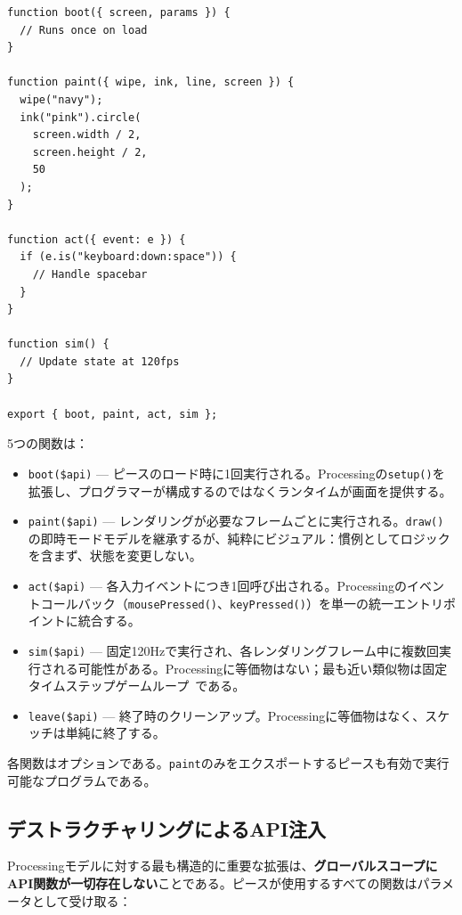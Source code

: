 \documentclass[10pt,letterpaper,twocolumn]{article}
\begin{document}
\begin{lstlisting}[style=acjsstyle,caption={最小限のACピース。}]
function boot({ screen, params }) {
  // Runs once on load
}

function paint({ wipe, ink, line, screen }) {
  wipe("navy");
  ink("pink").circle(
    screen.width / 2,
    screen.height / 2,
    50
  );
}

function act({ event: e }) {
  if (e.is("keyboard:down:space")) {
    // Handle spacebar
  }
}

function sim() {
  // Update state at 120fps
}

export { boot, paint, act, sim };
\end{lstlisting}

5つの関数は：

\begin{itemize}
  \item \texttt{boot(\$api)} --- ピースのロード時に1回実行される。Processingの\texttt{setup()}を拡張し、プログラマーが構成するのではなくランタイムが画面を提供する。
  \item \texttt{paint(\$api)} --- レンダリングが必要なフレームごとに実行される。\texttt{draw()}の即時モードモデルを継承するが、純粋にビジュアル：慣例としてロジックを含まず、状態を変更しない。
  \item \texttt{act(\$api)} --- 各入力イベントにつき1回呼び出される。Processingのイベントコールバック（\texttt{mousePressed()}、\texttt{keyPressed()}）を単一の統一エントリポイントに統合する。
  \item \texttt{sim(\$api)} --- 固定120Hzで実行され、各レンダリングフレーム中に複数回実行される可能性がある。Processingに等価物はない；最も近い類似物は固定タイムステップゲームループ~\citep{nystrom2014game}である。
  \item \texttt{leave(\$api)} --- 終了時のクリーンアップ。Processingに等価物はなく、スケッチは単純に終了する。
\end{itemize}

各関数はオプションである。\texttt{paint}のみをエクスポートするピースも有効で実行可能なプログラムである。

\subsection{デストラクチャリングによるAPI注入}

Processingモデルに対する最も構造的に重要な拡張は、\textbf{グローバルスコープにAPI関数が一切存在しない}ことである。ピースが使用するすべての関数はパラメータとして受け取る：
\end{document}
